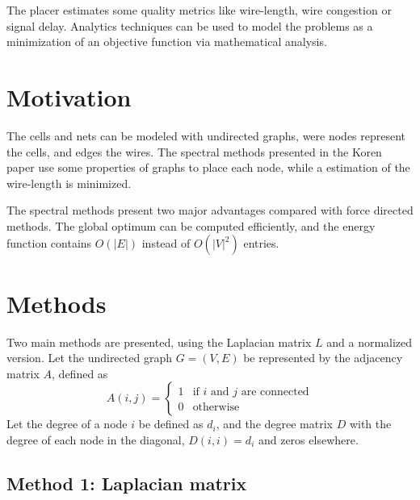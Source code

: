 \documentclass[a4paper,twocolumn]{article}
\begin{document}
The placer estimates some quality metrics like wire-length, wire congestion or 
signal delay. Analytics techniques can be used to model the problems as a 
minimization of an objective function via mathematical analysis.

\section{Motivation}

The cells and nets can be modeled with undirected graphs, were nodes represent 
the cells, and edges the wires. The spectral methods presented in the 
Koren~\cite{koren} paper use some properties of graphs to place each node, while 
a estimation of the wire-length is minimized.

The spectral methods present two major advantages compared with force directed 
methods. The global optimum can be computed efficiently, and the energy function 
contains $O(|E|)$ instead of $O(|V|^2)$ entries.

\section{Methods}

Two main methods are presented, using the Laplacian matrix $L$ and a normalized 
version. Let the undirected graph $G = (V, E)$ be represented by the adjacency 
matrix $A$, defined as
\begin{equation}
A(i,j) =
\begin{cases}
	1 & \text{if $i$ and $j$ are connected} \\
	0 & \text{otherwise}
\end{cases}
\end{equation}
Let the degree of a node $i$ be defined as $d_i$, and the degree matrix $D$ with 
the degree of each node in the diagonal, $D(i,i) = d_i$ and zeros elsewhere.  

\subsection{Method 1: Laplacian matrix}
\end{document}
